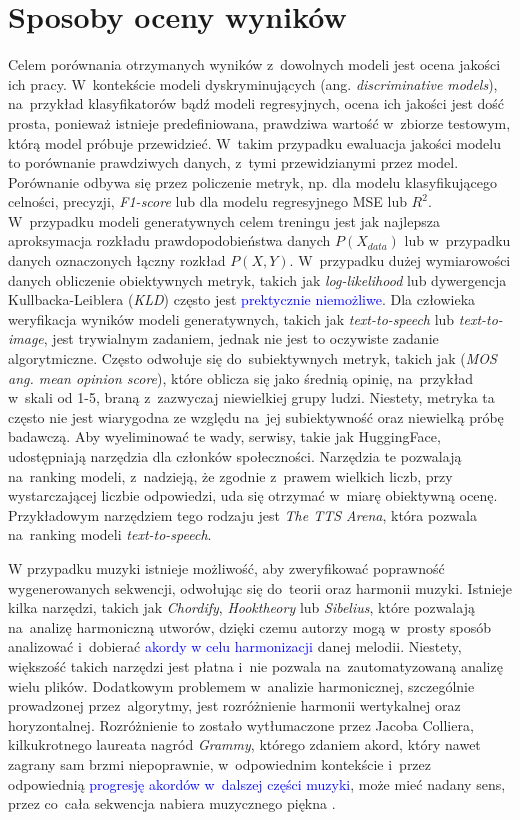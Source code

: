 \documentclass[data-science]{agh-wi} %
\begin{document}
\section{Sposoby oceny wyników}
Celem porównania otrzymanych wyników z~dowolnych modeli jest ocena jakości ich pracy. W~kontekście modeli dyskryminujących (ang. \textit{discriminative models}), na~przykład klasyfikatorów bądź modeli regresyjnych, ocena ich jakości jest dość prosta, ponieważ istnieje predefiniowana, prawdziwa wartość w~zbiorze testowym, którą model próbuje przewidzieć. W~takim przypadku ewaluacja jakości modelu to porównanie prawdziwych danych, z~tymi przewidzianymi przez model. Porównanie odbywa się przez policzenie metryk, np. dla modelu klasyfikującego celności, precyzji, \textit{F1-score} lub dla modelu regresyjnego MSE lub $R^2$. W~przypadku modeli generatywnych celem treningu jest jak najlepsza aproksymacja rozkładu prawdopodobieństwa danych $P(X_{data})$ lub w~przypadku danych oznaczonych łączny rozkład $P(X, Y)$. W~przypadku dużej wymiarowości danych obliczenie obiektywnych metryk, takich jak \textit{log-likelihood} lub dywergencja Kullbacka-Leiblera (\textit{KLD}) często jest \textcolor{blue}{prektycznie niemożliwe}. Dla człowieka weryfikacja wyników modeli generatywnych, takich jak \textit{text-to-speech} lub \textit{text-to-image}, jest trywialnym zadaniem, jednak nie jest to oczywiste zadanie algorytmiczne. Często odwołuje się do~subiektywnych metryk, takich jak (\textit{MOS ang. mean opinion score}), które oblicza się jako średnią opinię, na~przykład w~skali od 1-5, braną z~zazwyczaj niewielkiej grupy ludzi. Niestety, metryka ta często nie jest wiarygodna ze względu na~jej subiektywność oraz niewielką próbę badawczą. Aby wyeliminować te wady, serwisy, takie jak HuggingFace, udostępniają narzędzia dla członków społeczności. Narzędzia te pozwalają na~ranking modeli, z~nadzieją, że zgodnie z~prawem wielkich liczb, przy wystarczającej liczbie odpowiedzi, uda się otrzymać w~miarę obiektywną ocenę. Przykładowym narzędziem tego rodzaju jest \textit{The TTS Arena}\cite{tts_arena}, która pozwala na~ranking modeli \textit{text-to-speech}.

W przypadku muzyki istnieje możliwość, aby zweryfikować poprawność wygenerowanych sekwencji, odwołując się do~teorii oraz harmonii muzyki. Istnieje kilka narzędzi, takich jak \textit{Chordify}, \textit{Hooktheory} lub \textit{Sibelius}, które pozwalają na~analizę harmoniczną utworów, dzięki czemu autorzy mogą w~prosty sposób analizować i~dobierać \textcolor{blue}{akordy w celu harmonizacji} danej melodii. Niestety, większość takich narzędzi jest płatna i~nie pozwala na~zautomatyzowaną analizę wielu plików. Dodatkowym problemem w~analizie harmonicznej, szczególnie prowadzonej przez~algorytmy, jest rozróżnienie harmonii wertykalnej oraz horyzontalnej. Rozróżnienie to zostało wytłumaczone przez Jacoba Colliera, kilkukrotnego laureata nagród \textit{Grammy}, którego zdaniem akord, który nawet zagrany sam brzmi niepoprawnie, w~odpowiednim kontekście i~przez odpowiednią \textcolor{blue}{progresję akordów w~dalszej części muzyki}, może mieć nadany sens, przez co~cała sekwencja nabiera muzycznego piękna \cite{collier_wrongnote}.
\end{document}
